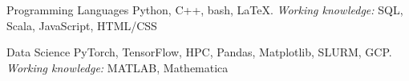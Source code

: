 \vspace{-3mm}
\begin{cvskills}

\cvskill
   {Programming Languages}
    {Python, C++, bash, \textrm{\LaTeX}. \textit{Working knowledge:} SQL, Scala, JavaScript, HTML/CSS}

  \cvskill
   {Data Science}
   {PyTorch, TensorFlow, HPC, Pandas, Matplotlib, SLURM, GCP. \textit{Working knowledge:} MATLAB, Mathematica}

 \vspace{-2mm}
\end{cvskills}

\vspace{-4mm}
